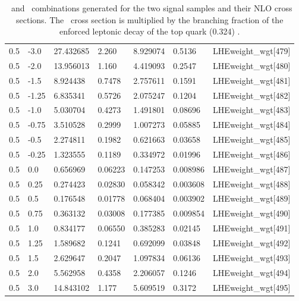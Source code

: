 \begin{table}[!htbp]
\begin{tabular}{lllllll}
    0.5  & -3.0  & 27.432685 & 2.260         & 8.929074  & 0.5136       & LHEweight\_wgt[479]\\
    0.5  & -2.0  & 13.956013 & 1.160         & 4.419093  & 0.2547       & LHEweight\_wgt[480]\\
    0.5  & -1.5  & 8.924438  & 0.7478        & 2.757611  & 0.1591       & LHEweight\_wgt[481]\\
    0.5  & -1.25 & 6.835341  & 0.5726        & 2.075247  & 0.1204       & LHEweight\_wgt[482]\\
    0.5  & -1.0  & 5.030704  & 0.4273        & 1.491801  & 0.08696      & LHEweight\_wgt[483]\\
    0.5  & -0.75 & 3.510528  & 0.2999        & 1.007273  & 0.05885      & LHEweight\_wgt[484]\\
    0.5  & -0.5  & 2.274811  & 0.1982        & 0.621663  & 0.03658      & LHEweight\_wgt[485]\\
    0.5  & -0.25 & 1.323555  & 0.1189        & 0.334972  & 0.01996      & LHEweight\_wgt[486]\\
    0.5  & 0.0   & 0.656969  & 0.06223       & 0.147253  & 0.008986     & LHEweight\_wgt[487]\\
    0.5  & 0.25  & 0.274423  & 0.02830       & 0.058342  & 0.003608     & LHEweight\_wgt[488]\\
    0.5  & 0.5   & 0.176548  & 0.01778       & 0.068404  & 0.003902     & LHEweight\_wgt[489]\\
    0.5  & 0.75  & 0.363132  & 0.03008       & 0.177385  & 0.009854     & LHEweight\_wgt[490]\\
    0.5  & 1.0   & 0.834177  & 0.06550       & 0.385283  & 0.02145      & LHEweight\_wgt[491]\\
    0.5  & 1.25  & 1.589682  & 0.1241        & 0.692099  & 0.03848      & LHEweight\_wgt[492]\\
    0.5  & 1.5   & 2.629647  & 0.2047        & 1.097834  & 0.06136      & LHEweight\_wgt[493]\\
    0.5  & 2.0   & 5.562958  & 0.4358        & 2.206057  & 0.1246       & LHEweight\_wgt[494]\\
    0.5  & 3.0   & 14.843102 & 1.177         & 5.609519  & 0.3172       & LHEweight\_wgt[495]\\ \hline
  \end{tabular}
  \caption[\CV\ and \Ct\ combinations.]{\CV\ and \Ct\ combinations generated for the two signal samples and their NLO cross sections. The \tHq\ cross section is multiplied by the branching fraction of the enforced leptonic decay of the top quark (0.324) \cite{THQProdTwiki}.}\label{tab:reweight}
\end{table}

